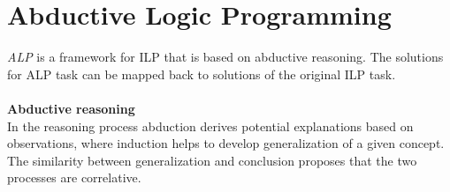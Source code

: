 \documentclass[11pt]{article}
\begin{document}
\section{Abductive Logic Programming}
\emph{ALP} is a framework for ILP that is based on abductive reasoning. The solutions for ALP task can be mapped back to solutions of the original ILP task.
\paragraph{}
\textbf{Abductive reasoning}\\
In the reasoning process abduction derives potential explanations based on observations, where induction helps to develop generalization of a given concept.\\
The similarity between generalization and conclusion proposes that the two processes are correlative.
\end{document}
